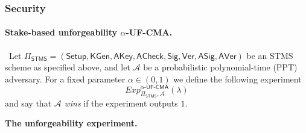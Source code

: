 \documentclass{article}
\begin{document}
\subsubsection{Security}

\paragraph{Stake-based unforgeability $\alpha$-\textsf{UF-CMA}.} \ 
Let 
$
  \Pi_{\mathsf{STMS}}
  =
  (\mathsf{Setup}, \mathsf{KGen}, \mathsf{AKey}, \mathsf{ACheck},
   \mathsf{Sig}, \mathsf{Ver}, \mathsf{ASig}, \mathsf{AVer})
$
be an STMS scheme as specified above, and let
$\mathcal{A}$ be a probabilistic polynomial-time (PPT) adversary.
For a fixed parameter $\alpha \in (0,1)$ we define the following
experiment
\[
  Exp^{\alpha\textsf{-UF-CMA}}_{\Pi_{\mathsf{STMS}},\mathcal{A}}(\lambda)
\]
and say that $\mathcal{A}$ \emph{wins} if the experiment outputs $1$.

\medskip
\noindent\textbf{The unforgeability experiment.}
\end{document}

